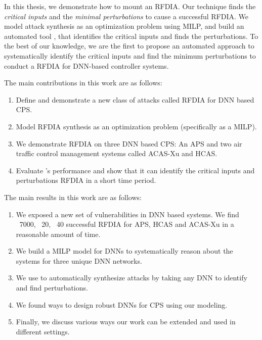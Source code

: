 In this thesis, we demonstrate how to mount an  \ac{RFDIA}.
Our technique finds the \textit{critical inputs} and the \textit{minimal perturbations} to cause a successful \ac{RFDIA}. 
We model attack synthesis as an optimization problem using \ac{MILP}, and build an automated tool \tool, that identifies the critical inputs and finds the perturbations.
To the best of our knowledge, we are the first to  propose an automated approach to systematically identify the critical inputs and find the minimum perturbations to conduct a \ac{RFDIA} for DNN-based controller systems.

The main contributions in this work are as follows:

\begin{enumerate}
	\item Define and demonstrate a new class of attacks called \ac{RFDIA} for \ac{DNN} based \ac{CPS}. 
	\item Model \ac{RFDIA} synthesis as an optimization problem (specifically as a \ac{MILP}). 
	\item We demonstrate \ac{RFDIA} on three \ac{DNN} based \ac{CPS}:  An \ac{APS} and two air traffic control management systems called \ac{ACAS-Xu} and \ac{HCAS}.
	\item Evaluate \tool's performance and show that it can identify the critical inputs and perturbations \ac{RFDIA} in a short time period.  
\end{enumerate}

The main results in this work are as follows:

\begin{enumerate}
	\item We exposed a new set of vulnerabilities in \ac{DNN} based systems. 
	 We find ~7000, ~20, ~40 successful \ac{RFDIA} for \ac{APS}, \ac{HCAS} and \ac{ACAS-Xu} in a reasonable amount of time. 
	\item We build a \ac{MILP} model for \ac{DNN}s to systematically reason about the systems for three unique \ac{DNN} networks. 
	\item We use \tool to automatically synthesize attacks by taking any \ac{DNN} to identify and find perturbations. 
	\item We found ways to design robust \ac{DNN}s for \ac{CPS} using our modeling. 
	\item Finally, we discuss various ways our work can be extended and used in different settings. 
\end{enumerate}

